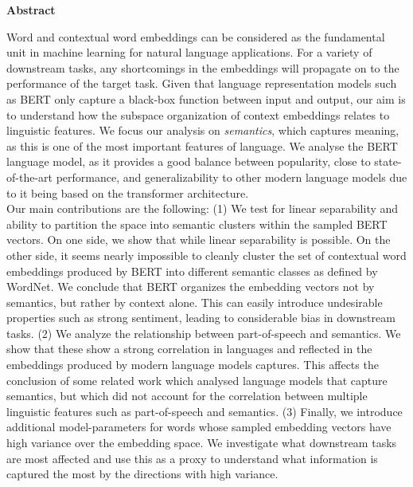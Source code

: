 \newpage
{\Huge \bf Abstract}
\vspace{24pt} 


Word and contextual word embeddings can be considered as the fundamental unit in machine learning for natural language applications.
For a variety of downstream tasks, any shortcomings in the embeddings will propagate on to the performance of the target task.
Given that language representation models such as BERT only capture a black-box function between input and output, our aim is to understand how the subspace organization of context embeddings relates to linguistic features.
We focus our analysis on \textit{semantics}, which captures meaning, as this is one of the most important features of language. 
We analyse the BERT language model, as it provides a good balance between popularity, close to state-of-the-art performance, and generalizability to other modern language models due to it being based on the transformer architecture.
\\

Our main contributions are the following: (1) We test for linear separability and ability to partition the space into semantic clusters within the sampled BERT vectors.
On one side, we show that while linear separability is possible. 
On the other side, it seems nearly impossible to cleanly cluster the set of contextual word embeddings produced by BERT into different semantic classes as defined by WordNet.
We conclude that BERT organizes the embedding vectors not by semantics, but rather by context alone.
This can easily introduce undesirable properties such as strong sentiment, leading to considerable bias in downstream tasks.
(2) We analyze the relationship between part-of-speech and semantics. 
We show that these show a strong correlation in languages and reflected in the embeddings produced by modern language models captures.
This affects the conclusion of some related work which analysed language models that capture semantics, but which did not account for the correlation between multiple linguistic features such as part-of-speech and semantics.
(3) Finally, we introduce additional model-parameters for words whose sampled embedding vectors have high variance over the embedding space.
We investigate what downstream tasks are most affected and use this as a proxy to understand what information is captured the most by the directions with high variance. \\

\newpage
\vspace*{\fill}
